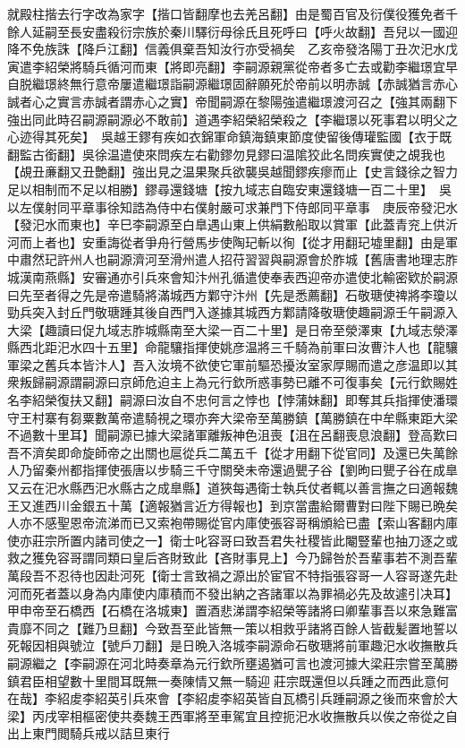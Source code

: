 就殿柱揩去行字改為家字【揩口皆翻摩也去羌呂翻】由是蜀百官及衍僕役獲免者千餘人延嗣至長安盡殺衍宗族於秦川驛衍母徐氏且死呼曰【呼火故翻】吾兒以一國迎降不免族誅【降戶江翻】信義俱棄吾知汝行亦受禍矣　乙亥帝發洛陽丁丑次汜水戊寅遣李紹榮將騎兵循河而東【將即亮翻】李嗣源親黨從帝者多亡去或勸李繼璟宜早自脱繼璟終無行意帝屢遣繼璟詣嗣源繼璟固辭願死於帝前以明赤誠【赤誠猶言赤心誠者心之實言赤誠者謂赤心之實】帝聞嗣源在黎陽強遣繼璟渡河召之【強其兩翻下強出同此時召嗣源嗣源必不敢前】道遇李紹榮紹榮殺之【李繼璟以死事君以明父之心迹得其死矣】　吳越王鏐有疾如衣錦軍命鎮海鎮東節度使留後傳瓘監國【衣于既翻監古銜翻】吳徐温遣使來問疾左右勸鏐勿見鏐曰温隂狡此名問疾實使之覘我也【覘丑亷翻又丑艶翻】強出見之温果聚兵欲襲吳越聞鏐疾瘳而止【史言錢徐之智力足以相制而不足以相勝】鏐尋還錢塘【按九域志自臨安東還錢塘一百二十里】　吳以左僕射同平章事徐知誥為侍中右僕射嚴可求兼門下侍郎同平章事　庚辰帝發汜水【發汜水而東也】辛巳李嗣源至白臯遇山東上供絹數船取以賞軍【此蓋青兖上供沂河而上者也】安重誨從者爭舟行營馬步使陶玘斬以徇【從才用翻玘墟里翻】由是軍中肅然玘許州人也嗣源濟河至滑州遣人招苻習習與嗣源會於胙城【舊唐書地理志胙城漢南燕縣】安審通亦引兵來會知汴州孔循遣使奉表西迎帝亦遣使北輸密欵於嗣源曰先至者得之先是帝遣騎將滿城西方鄴守汴州【先是悉薦翻】石敬瑭使禆將李瓊以勁兵突入封丘門敬瑭踵其後自西門入遂據其城西方鄴請降敬瑭使趣嗣源壬午嗣源入大梁【趣讀曰促九域志胙城縣南至大梁一百二十里】是日帝至滎澤東【九域志滎澤縣西北距汜水四十五里】命龍驤指揮使姚彦温將三千騎為前軍曰汝曹汴人也【龍驤軍梁之舊兵本皆汴人】吾入汝境不欲使它軍前驅恐擾汝室家厚賜而遣之彦温即以其衆叛歸嗣源謂嗣源曰京師危迫主上為元行欽所惑事勢已離不可復事矣【元行欽賜姓名李紹榮復扶又翻】嗣源曰汝自不忠何言之悖也【悖蒲妹翻】即奪其兵指揮使潘環守王村寨有芻粟數萬帝遣騎視之環亦奔大梁帝至萬勝鎮【萬勝鎮在中牟縣東距大梁不過數十里耳】聞嗣源已據大梁諸軍離叛神色沮喪【沮在呂翻喪息浪翻】登高歎曰吾不濟矣即命旋師帝之出關也扈從兵二萬五千【從才用翻下從官同】及還已失萬餘人乃留秦州都指揮使張唐以步騎三千守關癸未帝還過甖子谷【劉昫曰甖子谷在成臯又云在汜水縣西汜水縣古之成臯縣】道狹每遇衛士執兵仗者輒以善言撫之曰適報魏王又進西川金銀五十萬【適報猶言近方得報也】到京當盡給爾曹對曰陛下賜已晩矣人亦不感聖恩帝流涕而已又索袍帶賜從官内庫使張容哥稱頒給已盡【索山客翻内庫使亦莊宗所置内諸司使之一】衛士叱容哥曰致吾君失社稷皆此閹豎輩也抽刀逐之或救之獲免容哥謂同類曰皇后吝財致此【吝財事見上】今乃歸咎於吾輩事若不測吾輩萬段吾不忍待也因赴河死【衛士言致禍之源出於宦官不特指張容哥一人容哥遂先赴河而死者蓋以身為内庫使内庫積而不發出納之吝諸軍以為罪禍必先及故遽引决耳】甲申帝至石橋西【石橋在洛城東】置酒悲涕謂李紹榮等諸將曰卿輩事吾以來急難富貴靡不同之【難乃旦翻】今致吾至此皆無一策以相救乎諸將百餘人皆截髪置地誓以死報因相與號泣【號戶刀翻】是日晩入洛城李嗣源命石敬瑭將前軍趣汜水收撫散兵嗣源繼之【李嗣源在河北時奏章為元行欽所壅遏猶可言也渡河據大梁莊宗嘗至萬勝鎮君臣相望數十里間耳既無一奏陳情又無一騎迎莊宗既還但以兵踵之而西此意何在哉】李紹䖍李紹英引兵來會【李紹䖍李紹英皆自瓦橋引兵踵嗣源之後而來會於大梁】丙戌宰相樞密使共奏魏王西軍將至車駕宜且控扼汜水收撫散兵以俟之帝從之自出上東門閲騎兵戒以詰旦東行

